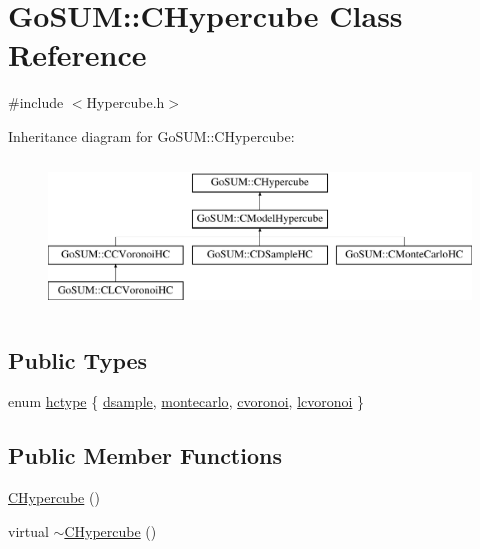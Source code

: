 \hypertarget{class_go_s_u_m_1_1_c_hypercube}{\section{Go\-S\-U\-M\-:\-:C\-Hypercube Class Reference}
\label{class_go_s_u_m_1_1_c_hypercube}
}


{\ttfamily \#include $<$Hypercube.\-h$>$}

Inheritance diagram for Go\-S\-U\-M\-:\-:C\-Hypercube\-:\begin{figure}[H]
\begin{center}
\leavevmode
\includegraphics[height=4.000000cm]{class_go_s_u_m_1_1_c_hypercube}
\end{center}
\end{figure}
\subsection*{Public Types}
\begin{DoxyCompactItemize}
\item 
enum \hyperlink{class_go_s_u_m_1_1_c_hypercube_a9113655515864c06ea6d4f08d5195c90}{hctype} \{ \hyperlink{class_go_s_u_m_1_1_c_hypercube_a9113655515864c06ea6d4f08d5195c90abe62aed07dcbdbeda5783e3345005e16}{dsample}, 
\hyperlink{class_go_s_u_m_1_1_c_hypercube_a9113655515864c06ea6d4f08d5195c90af9afda139c9899e40caa1661dee6d2a2}{montecarlo}, 
\hyperlink{class_go_s_u_m_1_1_c_hypercube_a9113655515864c06ea6d4f08d5195c90aa7aa76eb38939f209c50edb0c5ecd16f}{cvoronoi}, 
\hyperlink{class_go_s_u_m_1_1_c_hypercube_a9113655515864c06ea6d4f08d5195c90aa292c11539b19d2d7845af56abbd1460}{lcvoronoi}
 \}
\end{DoxyCompactItemize}
\subsection*{Public Member Functions}
\begin{DoxyCompactItemize}
\item 
\hyperlink{class_go_s_u_m_1_1_c_hypercube_ab10b56e929fd581467fac4bf8d141993}{C\-Hypercube} ()
\item 
virtual \hyperlink{class_go_s_u_m_1_1_c_hypercube_af040de408525be03112bbd560768a373}{$\sim$\-C\-Hypercube} ()
\end{DoxyCompactItemize}
